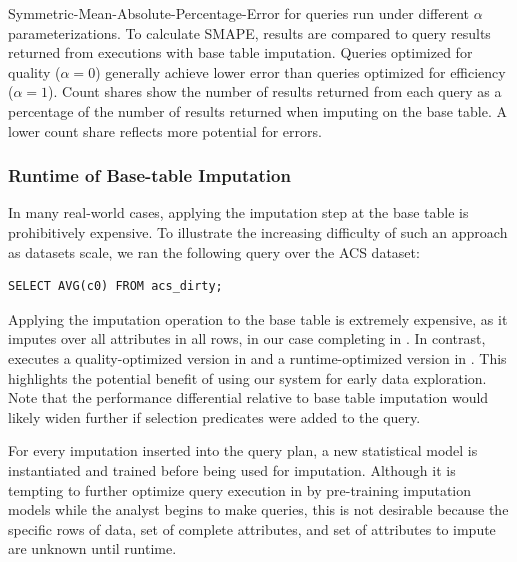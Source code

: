 \begin{table}
\centering

\caption{Symmetric-Mean-Absolute-Percentage-Error for queries run under different $\alpha$
    parameterizations. To calculate SMAPE, \ProjectName{} results are compared to query results returned
    from executions with base table imputation. Queries optimized
    for quality ($\alpha=0$) generally achieve lower error than queries optimized for
    efficiency ($\alpha=1$). Count shares show the number of results returned from each
    query as a percentage of the number of results returned when imputing on the base table.
    A lower count share reflects more potential for errors.}
\label{table:smape}
\end{table}


\subsubsection{Runtime of Base-table Imputation}
In many real-world cases, applying the imputation step at the base table is prohibitively
expensive.
To illustrate the increasing difficulty of such an approach as datasets scale, we ran the following query over the ACS dataset:
\begin{lstlisting}[breaklines]
SELECT AVG(c0) FROM acs_dirty;
\end{lstlisting}
Applying the imputation operation to the base table is extremely expensive, as it imputes over all attributes in all rows, in our case
completing in \acsbaseresultminutes{}. In contrast, \ProjectName{} executes a quality-optimized version
in \acsimputedbzeroresult{} and a runtime-optimized version in \acsimputedboneresult{}. This highlights the potential
benefit of using our system for early data exploration. Note that the performance differential relative to base table imputation
would likely widen further if selection predicates were added to the query.

For every imputation inserted into the query plan, a new statistical model is instantiated and trained before being used for imputation.
Although it is tempting to further optimize query execution in \ProjectName{} by pre-training imputation models while the analyst begins to make queries,
this is not desirable because the specific rows of data, set of complete attributes, and set of attributes to impute are unknown until runtime.



